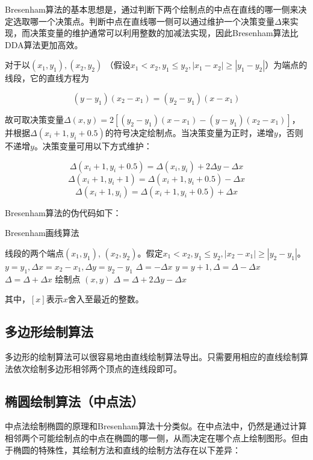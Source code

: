 \documentclass[a4paper,12pt]{article}
\begin{document}
Bresenham算法的基本思想是，通过判断下两个绘制点的中点在直线的哪一侧来决定选取哪一个决策点。判断中点在直线哪一侧可以通过维护一个决策变量$\Delta$来实现，而决策变量的维护通常可以利用整数的加减法实现\cite{wiki:Bresenham}，因此Bresenham算法比DDA算法更加高效。

对于以$(x_1, y_1), (x_2, y_2)$ （假设$x_1 < x_2, y_1 \leq y_2, |x_1 - x_2| \geq |y_1 - y_2|$）为端点的线段，它的直线方程为

$$ (y - y_1) (x_2 - x_1) = (y_2 - y_1)(x - x_1) $$

故可取决策变量$\Delta(x, y) = 2[(y_2 - y_1)(x - x_1) - (y - y_1)(x_2 - x_1)]$，并根据$\Delta(x_i+1, y_i+0.5)$的符号决定绘制点。当决策变量为正时，递增$y$，否则不递增$y$。决策变量可用以下方式维护：

$$ \Delta(x_i+1, y_i+0.5) = \Delta(x_i, y_i) + 2\Delta y - \Delta x $$
$$ \Delta(x_i+1, y_i+1) = \Delta(x_i+1, y_i+0.5) - \Delta x $$
$$ \Delta(x_i+1, y_i) = \Delta(x_i+1, y_i+0.5) + \Delta x $$

Bresenham算法的伪代码如下：

\begin{algorithm}[htb] 
\caption{Bresenham画线算法} 
\label{alg:Bresenham} 
\begin{algorithmic}[1] 
\Require 
线段的两个端点$(x_1, y_1)$, $(x_2, y_2)$。假定$x_1 < x_2, y_1 \leq y_2, |x_2 - x_1| \geq |y_2 - y_1|$。
\State $y = y_1, \Delta x = x_2 - x_1, \Delta y = y_2 - y_1$
\State $\Delta = -\Delta x$
	\State $y = y + 1, \Delta = \Delta - \Delta x$ 
	\Else
	\State $\Delta = \Delta + \Delta x$
	\EndIf
    \State 绘制点 $(x, y)$
    \State $\Delta = \Delta + 2\Delta y - \Delta x$
\EndFor
\end{algorithmic} 
\end{algorithm}

其中，$[x]$表示$x$舍入至最近的整数。

\subsection{多边形绘制算法}
多边形的绘制算法可以很容易地由直线绘制算法导出。只需要用相应的直线绘制算法依次绘制多边形相邻两个顶点的连线段即可。


\subsection{椭圆绘制算法（中点法）}
中点法绘制椭圆的原理和Bresenham算法十分类似。在中点法中，仍然是通过计算相邻两个可能绘制点的中点在椭圆的哪一侧，从而决定在哪个点上绘制图形。但由于椭圆的特殊性，其绘制方法和直线的绘制方法存在以下差异：
\end{document}

